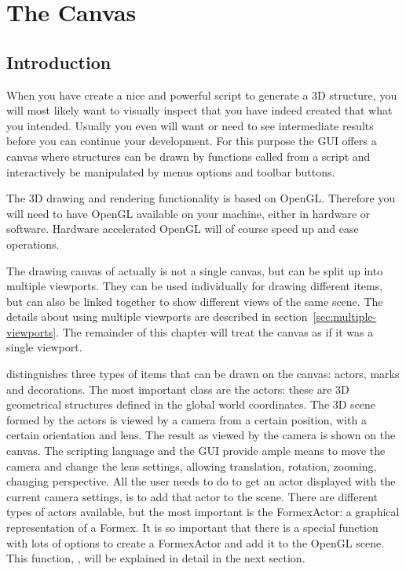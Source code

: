 
\chapter{The Canvas}
\label{cha:canvas}

\section{Introduction}
When you have create a nice and powerful script to generate a 3D structure, you will most likely want to visually inspect that you have indeed created that what you intended. Usually you even will want or need to see intermediate results before you can continue your development. 
For this purpose the \pyformex GUI offers a canvas where structures can be drawn by functions called from a script and interactively be manipulated by menus options and toolbar buttons.

The 3D drawing and rendering functionality is based on OpenGL. Therefore you will need to have OpenGL available on your machine, either in hardware or software. Hardware accelerated OpenGL will of course speed up and ease operations.

The drawing canvas of \pyformex actually is not a single canvas, but can be split up into multiple viewports. They can be used individually for drawing different items, but can also be linked together to show different views of the same scene. The details about using multiple viewports are described in section~\ref{sec:multiple-viewports}. The remainder of this chapter will treat the canvas as if it was a single viewport.

\pyformex distinguishes three types of items that can be drawn on the canvas: actors, marks and decorations. The most important class are the actors: these are 3D geometrical structures defined in the global world coordinates. The 3D scene formed by the actors is viewed by a camera from a certain position, with a certain orientation and lens. The result as viewed by the camera is shown on the canvas. The \pyformex scripting language and the GUI provide ample means to move the camera and change the lens settings, allowing translation, rotation, zooming, changing perspective. All the user needs to do to get an actor displayed with the current camera settings, is to add that actor to the scene. There are different types of actors available, but the most important is the FormexActor: a graphical representation of a Formex. It is so important that there is a special function with lots of options to create a FormexActor and add it to the OpenGL scene.
This function, , will be explained in detail in the next section.

